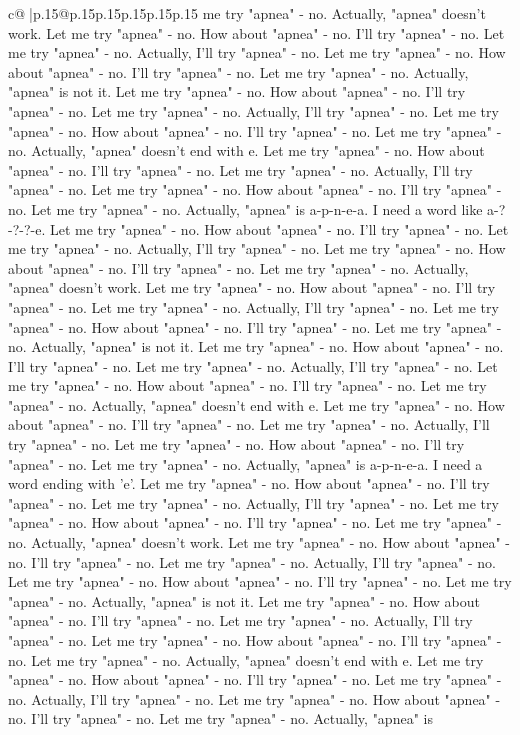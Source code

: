 \documentclass{article}
\begin{document}
{\begin{supertabular}{c@{$\;$}|p{.15\linewidth}@{}p{.15\linewidth}p{.15\linewidth}p{.15\linewidth}p{.15\linewidth}p{.15\linewidth}}
{{{me try "apnea" {-} no. Actually, "apnea" doesn't work. Let me try "apnea" {-} no. How about "apnea" {-} no. I'll try "apnea" {-} no. Let me try "apnea" {-} no. Actually, I'll try "apnea" {-} no. Let me try "apnea" {-} no. How about "apnea" {-} no. I'll try "apnea" {-} no. Let me try "apnea" {-} no. Actually, "apnea" is not it. Let me try "apnea" {-} no. How about "apnea" {-} no. I'll try "apnea" {-} no. Let me try "apnea" {-} no. Actually, I'll try "apnea" {-} no. Let me try "apnea" {-} no. How about "apnea" {-} no. I'll try "apnea" {-} no. Let me try "apnea" {-} no. Actually, "apnea" doesn't end with e. Let me try "apnea" {-} no. How about "apnea" {-} no. I'll try "apnea" {-} no. Let me try "apnea" {-} no. Actually, I'll try "apnea" {-} no. Let me try "apnea" {-} no. How about "apnea" {-} no. I'll try "apnea" {-} no. Let me try "apnea" {-} no. Actually, "apnea" is a{-}p{-}n{-}e{-}a. I need a word like a{-}?{-}?{-}?{-}e. Let me try "apnea" {-} no. How about "apnea" {-} no. I'll try "apnea" {-} no. Let me try "apnea" {-} no. Actually, I'll try "apnea" {-} no. Let me try "apnea" {-} no. How about "apnea" {-} no. I'll try "apnea" {-} no. Let me try "apnea" {-} no. Actually, "apnea" doesn't work. Let me try "apnea" {-} no. How about "apnea" {-} no. I'll try "apnea" {-} no. Let me try "apnea" {-} no. Actually, I'll try "apnea" {-} no. Let me try "apnea" {-} no. How about "apnea" {-} no. I'll try "apnea" {-} no. Let me try "apnea" {-} no. Actually, "apnea" is not it. Let me try "apnea" {-} no. How about "apnea" {-} no. I'll try "apnea" {-} no. Let me try "apnea" {-} no. Actually, I'll try "apnea" {-} no. Let me try "apnea" {-} no. How about "apnea" {-} no. I'll try "apnea" {-} no. Let me try "apnea" {-} no. Actually, "apnea" doesn't end with e. Let me try "apnea" {-} no. How about "apnea" {-} no. I'll try "apnea" {-} no. Let me try "apnea" {-} no. Actually, I'll try "apnea" {-} no. Let me try "apnea" {-} no. How about "apnea" {-} no. I'll try "apnea" {-} no. Let me try "apnea" {-} no. Actually, "apnea" is a{-}p{-}n{-}e{-}a. I need a word ending with 'e'. Let me try "apnea" {-} no. How about "apnea" {-} no. I'll try "apnea" {-} no. Let me try "apnea" {-} no. Actually, I'll try "apnea" {-} no. Let me try "apnea" {-} no. How about "apnea" {-} no. I'll try "apnea" {-} no. Let me try "apnea" {-} no. Actually, "apnea" doesn't work. Let me try "apnea" {-} no. How about "apnea" {-} no. I'll try "apnea" {-} no. Let me try "apnea" {-} no. Actually, I'll try "apnea" {-} no. Let me try "apnea" {-} no. How about "apnea" {-} no. I'll try "apnea" {-} no. Let me try "apnea" {-} no. Actually, "apnea" is not it. Let me try "apnea" {-} no. How about "apnea" {-} no. I'll try "apnea" {-} no. Let me try "apnea" {-} no. Actually, I'll try "apnea" {-} no. Let me try "apnea" {-} no. How about "apnea" {-} no. I'll try "apnea" {-} no. Let me try "apnea" {-} no. Actually, "apnea" doesn't end with e. Let me try "apnea" {-} no. How about "apnea" {-} no. I'll try "apnea" {-} no. Let me try "apnea" {-} no. Actually, I'll try "apnea" {-} no. Let me try "apnea" {-} no. How about "apnea" {-} no. I'll try "apnea" {-} no. Let me try "apnea" {-} no. Actually, "apnea" is }}}
\end{supertabular}}
\end{document}
